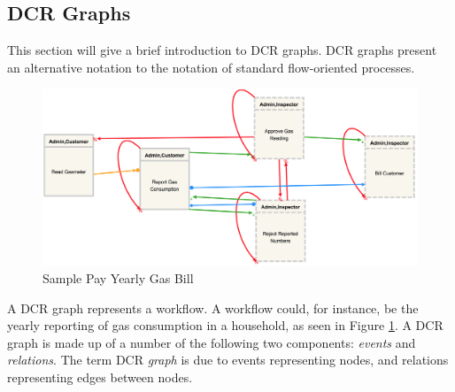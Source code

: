 \subsection{DCR Graphs}
This section will give a brief introduction to DCR graphs. DCR graphs present an alternative notation to the notation of standard flow-oriented processes.

\begin{figure}[h!]
\center
\includegraphics[width=\linewidth]{Figures/gas}
\caption{\label{SampleGasFlow} Sample Pay Yearly Gas Bill }
\end{figure}

A DCR graph represents a workflow. A workflow could, for instance, be the yearly reporting of gas consumption in a household, as seen in Figure \ref{SampleGasFlow}. A DCR graph is made up of a number of the following two components: \textit{events} and \textit{relations}. The term DCR \textit{graph} is due to events representing nodes, and relations representing edges between nodes.




